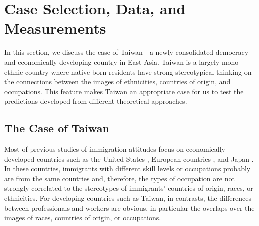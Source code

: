 \documentclass[12pt]{article}
\begin{document}















\section{Case Selection, Data, and Measurements}


In this section, we discuss the case of Taiwan---a newly consolidated democracy and economically developing country in East Asia. Taiwan is a largely mono-ethnic country where native-born residents have strong stereotypical thinking on the connections between the images of ethnicities, countries of origin, and occupations. This feature makes Taiwan an appropriate case for us to test the predictions developed from different theoretical approaches.


\subsection{The Case of Taiwan}


Most of previous studies of immigration attitudes focus on economically developed countries such as the United States \citep[e.g.,][]{Citrinetal1997, ScheveSlaughter2001}, European countries \citep[e.g.,][]{DustmannPreston2007, HainmuellerHiscox2007}, and Japan \citep{Green2017}. In these countries, immigrants with different skill levels or occupations probably are from the same countries and, therefore, the types of occupation are not strongly correlated to the stereotypes of immigrants' countries of origin, races, or ethnicities. For developing countries such as Taiwan, in contrasts, the differences between professionals and workers are obvious, in particular the overlaps over the images of races, countries of origin, or occupations.
\end{document}
